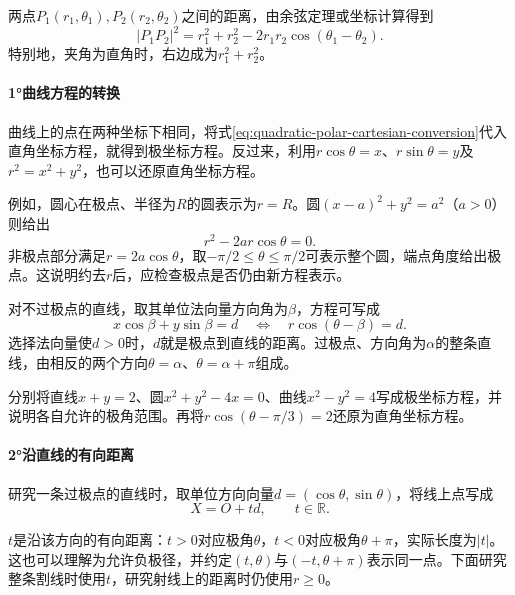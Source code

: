 两点\(P_1(r_1,\theta_1),P_2(r_2,\theta_2)\)之间的距离，由余弦定理或坐标计算得到
\begin{equation}\label{eq:quadratic-polar-distance}
 |P_1P_2|^2=r_1^2+r_2^2-2r_1r_2\cos(\theta_1-\theta_2).
\end{equation}
特别地，夹角为直角时，右边成为\(r_1^2+r_2^2\)。

\paragraph{1°曲线方程的转换} \mbox{}

曲线上的点在两种坐标下相同，将式\eqref{eq:quadratic-polar-cartesian-conversion}代入直角坐标方程，就得到极坐标方程。反过来，利用\(r\cos\theta=x\)、\(r\sin\theta=y\)及\(r^2=x^2+y^2\)，也可以还原直角坐标方程。

例如，圆心在极点、半径为\(R\)的圆表示为\(r=R\)。圆\((x-a)^2+y^2=a^2\)（\(a>0\)）则给出
\begin{equation*}
 r^2-2ar\cos\theta=0.
\end{equation*}
非极点部分满足\(r=2a\cos\theta\)，取\(-\pi/2\le\theta\le\pi/2\)可表示整个圆，端点角度给出极点。这说明约去\(r\)后，应检查极点是否仍由新方程表示。

对不过极点的直线，取其单位法向量方向角为\(\beta\)，方程可写成
\begin{equation}\label{eq:quadratic-polar-line-normal}
 x\cos\beta+y\sin\beta=d
 \quad\Longleftrightarrow\quad
 r\cos(\theta-\beta)=d.
\end{equation}
选择法向量使\(d>0\)时，\(d\)就是极点到直线的距离。过极点、方向角为\(\alpha\)的整条直线，由相反的两个方向\(\theta=\alpha\)、\(\theta=\alpha+\pi\)组成。

\par\addvspace{6pt}\noindent\begin{minipage}{\linewidth}
\begin{example}
分别将直线\(x+y=2\)、圆\(x^2+y^2-4x=0\)、曲线\(x^2-y^2=4\)写成极坐标方程，并说明各自允许的极角范围。再将\(r\cos(\theta-\pi/3)=2\)还原为直角坐标方程。
\end{example}
\end{minipage}\par\addvspace{6pt}

\paragraph{2°沿直线的有向距离} \mbox{}

研究一条过极点的直线时，取单位方向向量\(d=(\cos\theta,\sin\theta)\)，将线上点写成
\begin{equation}\label{eq:quadratic-polar-signed-radius}
 X=O+td,\qquad t\in\mathbb R.
\end{equation}
\begin{samepage}
\(t\)是沿该方向的有向距离：\(t>0\)对应极角\(\theta\)，\(t<0\)对应极角\(\theta+\pi\)，实际长度为\(|t|\)。这也可以理解为允许负极径，并约定\((t,\theta)\)与\((-t,\theta+\pi)\)表示同一点。下面研究整条割线时使用\(t\)，研究射线上的距离时仍使用\(r\ge0\)。
\par\end{samepage}

